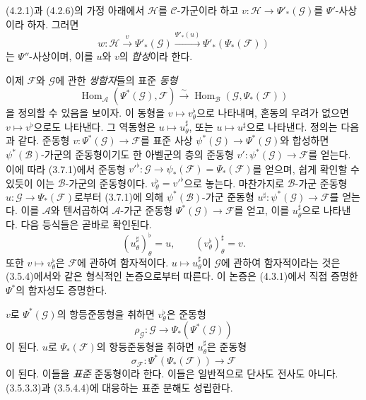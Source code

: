 \begin{env}[4.4.2]
\label{0.4.4.2-ko}
(4.2.1)과 (4.2.6)의 가정 아래에서 $\mathcal H$를 $\mathcal C$-가군이라
하고 $v:\mathcal H\to\Psi'_*(\mathcal G)$를 $\Psi'$-사상이라 하자.
그러면
\[
  w:\mathcal H\xrightarrow{v}\Psi'_*(\mathcal G)
  \xrightarrow{\Psi'_*(u)}\Psi'_*(\Psi_*(\mathcal F))
\]
는 $\Psi''$-사상이며, 이를 $u$와 $v$의 \emph{합성}이라 한다.
\end{env}

\begin{env}[4.4.3]
\label{0.4.4.3-ko}
이제 $\mathcal F$와 $\mathcal G$에 관한 \emph{쌍함자}들의 표준
\emph{동형}
\[
  \operatorname{Hom}_{\mathcal A}(\Psi^*(\mathcal G),\mathcal F)
  \xrightarrow{\sim}
  \operatorname{Hom}_{\mathcal B}(\mathcal G,\Psi_*(\mathcal F))
  \tag{4.4.3.1}\label{0.4.4.3.1-ko}
\]
을 정의할 수 있음을 보이자. 이 동형을
$v\mapsto v_\theta^\flat$으로 나타내며, 혼동의 우려가 없으면
$v\mapsto v^\flat$으로도 나타낸다. 그 역동형은
$u\mapsto u_\theta^\sharp$, 또는 $u\mapsto u^\sharp$으로 나타낸다.
정의는 다음과 같다. 준동형
$v:\Psi^*(\mathcal G)\to\mathcal F$를 표준 사상
$\psi^*(\mathcal G)\to\Psi^*(\mathcal G)$와 합성하면
$\psi^*(\mathcal B)$-가군의 준동형이기도 한 아벨군의 층의 준동형
$v':\psi^*(\mathcal G)\to\mathcal F$를 얻는다. 이에 따라 (3.7.1)에서
준동형
${v'}^\flat:\mathcal G\to\psi_*(\mathcal F)=\Psi_*(\mathcal F)$를
얻으며, 쉽게 확인할 수 있듯이 이는 $\mathcal B$-가군의 준동형이다.
$v_\theta^\flat={v'}^\flat$으로 놓는다. 마찬가지로
$\mathcal B$-가군 준동형 $u:\mathcal G\to\Psi_*(\mathcal F)$로부터
(3.7.1)에 의해 $\psi^*(\mathcal B)$-가군 준동형
$u^\sharp:\psi^*(\mathcal G)\to\mathcal F$를 얻는다. 이를
$\mathcal A$와 텐서곱하여 $\mathcal A$-가군 준동형
$\Psi^*(\mathcal G)\to\mathcal F$를 얻고, 이를
$u_\theta^\sharp$으로 나타낸다. 다음 등식들은 곧바로 확인된다.
\[
  (u_\theta^\sharp)_\theta^\flat=u,
  \qquad
  (v_\theta^\flat)_\theta^\sharp=v.
\]
또한 $v\mapsto v_\theta^\flat$은 $\mathcal F$에 관하여 함자적이다.
$u\mapsto u_\theta^\sharp$이 $\mathcal G$에 관하여 함자적이라는 것은
(3.5.4)에서와 같은 형식적인 논증으로부터 따른다. 이 논증은
(4.3.1)에서 직접 증명한 $\Psi^*$의 함자성도 증명한다.

$v$로 $\Psi^*(\mathcal G)$의 항등준동형을 취하면
$v_\theta^\flat$은 준동형
\[
  \rho_{\mathcal G}:\mathcal G\longrightarrow
  \Psi_*(\Psi^*(\mathcal G))
  \tag{4.4.3.2}\label{0.4.4.3.2-ko}
\]
이 된다. $u$로 $\Psi_*(\mathcal F)$의 항등준동형을 취하면
$u_\theta^\sharp$은 준동형
\[
  \sigma_{\mathcal F}:\Psi^*(\Psi_*(\mathcal F))
  \longrightarrow\mathcal F
  \tag{4.4.3.3}\label{0.4.4.3.3-ko}
\]
이 된다. 이들을 \emph{표준} 준동형이라 한다. 이들은 일반적으로
단사도 전사도 아니다. (3.5.3.3)과 (3.5.4.4)에 대응하는 표준 분해도
성립한다.


\end{env}
